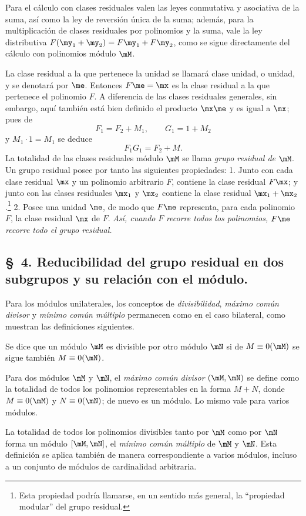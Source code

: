 \documentclass[11pt]{article}
\begin{document}
Para el cálculo con clases residuales valen las leyes conmutativa y asociativa de la suma, así como la ley de reversión única de la suma; además, para la multiplicación de clases residuales por polinomios y la suma, vale la ley distributiva $F(\my_1+\my_2)=F\my_1+F\my_2$, como se sigue directamente del cálculo con polinomios módulo $\mM$.

La clase residual a la que pertenece la unidad se llamará clase unidad, o unidad, y se denotará por $\me$. Entonces $F\me=\mx$ es la clase residual a la que pertenece el polinomio $F$. A diferencia de las clases residuales generales, sin embargo, aquí también está bien definido el producto $\mx\me$ y es igual a $\mx$; pues de
\[
 F_1=F_2+M_1,\qquad G_1=1+M_2
\]
y $M_1\cdot1=M_1$ se deduce
\[
 F_1G_1=F_2+M.
\]
La totalidad de las clases residuales módulo $\mM$ se llama \emph{grupo residual de} $\mM$. Un grupo residual posee por tanto las siguientes propiedades: 1. Junto con cada clase residual $\mx$ y un polinomio arbitrario $F$, contiene la clase residual $F\mx$; y junto con las clases residuales $\mx_1$ y $\mx_2$ contiene la clase residual $\mx_1+\mx_2$.\footnote{Esta propiedad podría llamarse, en un sentido más general, la ``propiedad modular'' del grupo residual.} 2. Posee una unidad $\me$, de modo que $F\me$ representa, para cada polinomio $F$, la clase residual $\mx$ de $F$. \emph{Así, cuando} $F$ \emph{recorre todos los polinomios,} $F\me$ \emph{recorre todo el grupo residual.}

\subsection*{\S~4. Reducibilidad del grupo residual en dos subgrupos y su relación con el módulo.}

Para los módulos unilaterales, los conceptos de \emph{divisibilidad}, \emph{máximo común divisor} y \emph{mínimo común múltiplo} permanecen como en el caso bilateral, como muestran las definiciones siguientes.

Se dice que un módulo $\mM$ es divisible por otro módulo $\mN$ si de $M\equiv0(\mM)$ se sigue también $M\equiv0(\mN)$.

Para dos módulos $\mM$ y $\mN$, el \emph{máximo común divisor} $(\mM,\mN)$ se define como la totalidad de todos los polinomios representables en la forma $M+N$, donde $M\equiv0(\mM)$ y $N\equiv0(\mN)$; de nuevo es un módulo. Lo mismo vale para varios módulos.

La totalidad de todos los polinomios divisibles tanto por $\mM$ como por $\mN$ forma un módulo $[\mM,\mN]$, el \emph{mínimo común múltiplo} de $\mM$ y $\mN$. Esta definición se aplica también de manera correspondiente a varios módulos, incluso a un conjunto de módulos de cardinalidad arbitraria.
\end{document}
